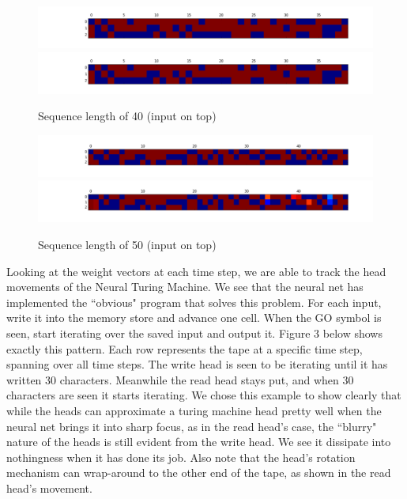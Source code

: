 \documentclass[12pt]{article}
\begin{document}
\begin{figure}[h]
\includegraphics[width=\textwidth]{inputs40}
\includegraphics[width=\textwidth]{outputs40}
\caption{Sequence length of 40 (input on top)}
\includegraphics[width=\textwidth]{inputs50}
\includegraphics[width=\textwidth]{outputs50}
\caption{Sequence length of 50 (input on top)}
\end{figure}

Looking at the weight vectors at each time step, we are able to track
the head movements of the Neural Turing Machine. We see that the neural net has
implemented the ``obvious" program that solves
this problem. For each input, write it into the memory store and advance one cell.
When the
GO symbol is seen, start iterating over the saved input and output it.
Figure 3 below shows exactly this pattern. Each row represents the tape
at a specific time step, spanning over all time steps. The write head is seen to
be iterating until it has written 30 characters. Meanwhile the read head stays
put, and when 30 characters are seen it starts iterating. We chose this example
to show clearly that while the heads can approximate a turing machine head
pretty well when the neural net brings it into sharp focus, as in the read head's case,
the ``blurry" nature of the heads is still evident from the write head. We
see it dissipate into nothingness when it has done its job. Also note that
the head's rotation mechanism can wrap-around to the other end of the tape, 
as shown in the read head's movement.
\end{document}
